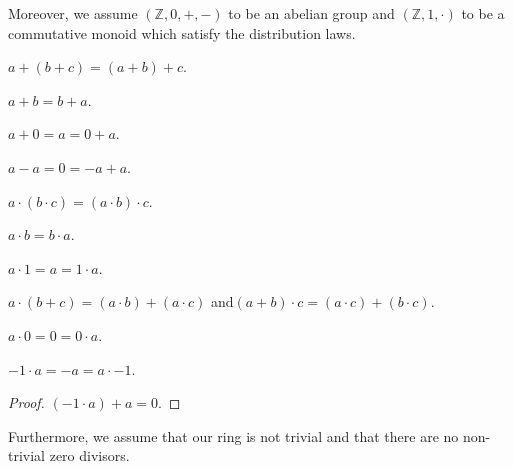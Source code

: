 \documentclass{article}
\newcommand{\Int}{\mathbb{Z}}
\begin{document}
  Moreover, we assume $(\Int, 0, +, -)$ to be an abelian group and $(\Int, 1, \cdot)$ to be a commutative monoid which satisfy the distribution laws.

  \begin{forthel}
    \begin{axiom}[AddAsso]
      $a + (b + c) = (a + b) + c$.
    \end{axiom}

    \begin{axiom}[AddComm]
      $a + b = b + a$.
    \end{axiom}

    \begin{axiom}[AddZero]
      $a + 0 = a = 0 + a$.
    \end{axiom}

    \begin{axiom}[AddNeg]
      $a - a = 0 = -a + a$.
    \end{axiom}

    \begin{axiom}[MulAsso]
      $a \cdot (b \cdot c) = (a \cdot b) \cdot c$.
    \end{axiom}

    \begin{axiom}[MulComm]
      $a \cdot b = b \cdot a$.
    \end{axiom}

    \begin{axiom}[MulOne]
      $a \cdot 1 = a = 1 \cdot a$.
    \end{axiom}

    \begin{axiom}[Distrib]
      $a \cdot (b + c) = (a \cdot b) + (a \cdot c)$ and$ (a + b) \cdot c = (a \cdot c) + (b \cdot c)$.
    \end{axiom}

    \begin{lemma}[MulZero]
      $a \cdot 0 = 0 = 0 \cdot a$.
    \end{lemma}

    \begin{lemma}[MulMinOne]
      $-1 \cdot a = -a = a \cdot -1$.
    \end{lemma}
    \begin{proof}
      $(-1 \cdot a) + a = 0$.
    \end{proof}
  \end{forthel}

  Furthermore, we assume that our ring is not trivial and that there are no non-trivial zero divisors.
\end{document}
